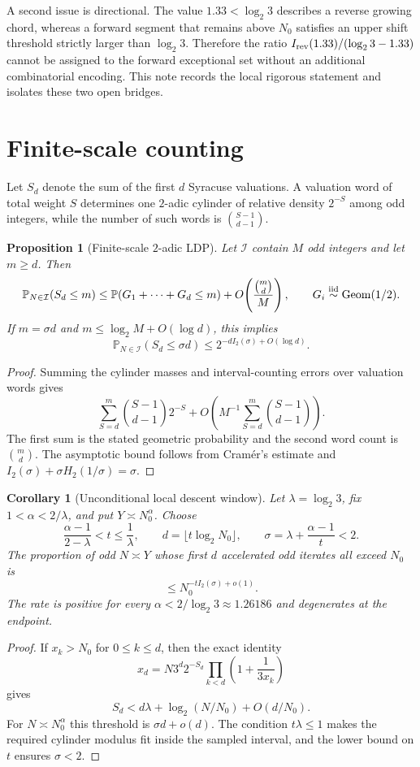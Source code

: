 \documentclass[12pt,a4paper]{article}
\newtheorem{proposition}[theorem]{Proposition}
\newtheorem{corollary}[theorem]{Corollary}
\theoremstyle{remark}
\begin{document}
A second issue is directional.  The value $1.33<\log_2 3$ describes a reverse
growing chord, whereas a forward segment that remains above $N_0$ satisfies an
upper shift threshold strictly larger than $\log_2 3$.  Therefore the ratio
$I_{\rm rev}(1.33)/(\log_2 3-1.33)$ cannot be assigned to the forward
exceptional set without an additional combinatorial encoding.  This note
records the local rigorous statement and isolates these two open bridges.

\section*{Finite-scale counting}

Let $S_d$ denote the sum of the first $d$ Syracuse valuations.  A valuation
word of total weight $S$ determines one $2$-adic cylinder of relative density
$2^{-S}$ among odd integers, while the number of such words is
$\binom{S-1}{d-1}$.

\begin{proposition}[Finite-scale $2$-adic LDP]
Let $\mathcal I$ contain $M$ odd integers and let $m\ge d$.  Then
\[
 \mathbb P_{N\in\mathcal I}(S_d\le m)
 \le \mathbb P(G_1+\cdots+G_d\le m)
   +O\!\left(\frac{\binom md}{M}\right),
 \qquad G_i\stackrel{\rm iid}{\sim}{\rm Geom}(1/2).
\]
If $m=\sigma d$ and $m\le\log_2M+O(\log d)$, this implies
\[
 \mathbb P_{N\in\mathcal I}(S_d\le\sigma d)
 \le 2^{-dI_2(\sigma)+O(\log d)}.
\]
\end{proposition}
\begin{proof}
Summing the cylinder masses and interval-counting errors over valuation words
gives
\[
 \sum_{S=d}^m\binom{S-1}{d-1}2^{-S}
 +O\!\left(M^{-1}\sum_{S=d}^m\binom{S-1}{d-1}\right).
\]
The first sum is the stated geometric probability and the second word count is
$\binom md$.  The asymptotic bound follows from Cram\'er's estimate and
$I_2(\sigma)+\sigma H_2(1/\sigma)=\sigma$.
\end{proof}

\begin{corollary}[Unconditional local descent window]
Let $\lambda=\log_2 3$, fix $1<\alpha<2/\lambda$, and put
$Y\asymp N_0^\alpha$.  Choose
\[
 \frac{\alpha-1}{2-\lambda}<t\le\frac1\lambda,
 \qquad d=\lfloor t\log_2N_0\rfloor,
 \qquad \sigma=\lambda+\frac{\alpha-1}{t}<2.
\]
The proportion of odd $N\asymp Y$ whose first $d$ accelerated odd iterates all
exceed $N_0$ is
\[
 \le N_0^{-tI_2(\sigma)+o(1)}.
\]
The rate is positive for every $\alpha<2/\log_2 3\approx1.26186$ and
degenerates at the endpoint.
\end{corollary}
\begin{proof}
If $x_k>N_0$ for $0\le k\le d$, then the exact identity
\[
 x_d=N3^d2^{-S_d}\prod_{k<d}\left(1+\frac1{3x_k}\right)
\]
gives
\[
 S_d<d\lambda+\log_2(N/N_0)+O(d/N_0).
\]
For $N\asymp N_0^\alpha$ this threshold is $\sigma d+o(d)$.  The condition
$t\lambda\le1$ makes the required cylinder modulus fit inside the sampled
interval, and the lower bound on $t$ ensures $\sigma<2$.
\end{proof}
\end{document}
